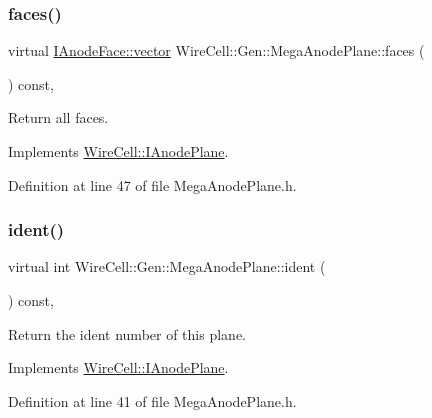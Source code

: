 \subsubsection{\texorpdfstring{faces()}{faces()}}
{\footnotesize\ttfamily virtual \hyperlink{class_wire_cell_1_1_i_component_a18978d88ce697af5941655a89660fd4e}{I\+Anode\+Face\+::vector} Wire\+Cell\+::\+Gen\+::\+Mega\+Anode\+Plane\+::faces (\begin{DoxyParamCaption}{ }\end{DoxyParamCaption}) const\hspace{0.3cm}{\ttfamily [inline]}, {\ttfamily [virtual]}}



Return all faces. 



Implements \hyperlink{class_wire_cell_1_1_i_anode_plane_a22ebdffd5613bf8007e0ae314984c36a}{Wire\+Cell\+::\+I\+Anode\+Plane}.



Definition at line 47 of file Mega\+Anode\+Plane.\+h.

\mbox{\label{class_wire_cell_1_1_gen_1_1_mega_anode_plane_a4f464401cebc46073d4fef4cafe67d97}} 
\subsubsection{\texorpdfstring{ident()}{ident()}}
{\footnotesize\ttfamily virtual int Wire\+Cell\+::\+Gen\+::\+Mega\+Anode\+Plane\+::ident (\begin{DoxyParamCaption}{ }\end{DoxyParamCaption}) const\hspace{0.3cm}{\ttfamily [inline]}, {\ttfamily [virtual]}}



Return the ident number of this plane. 



Implements \hyperlink{class_wire_cell_1_1_i_anode_plane_a18dfeccffc41a8fca3631a4e98967c57}{Wire\+Cell\+::\+I\+Anode\+Plane}.



Definition at line 41 of file Mega\+Anode\+Plane.\+h.

\mbox{\label{class_wire_cell_1_1_gen_1_1_mega_anode_plane_a4ccf1f789e1f62b35993d95b659b92c3}} 
